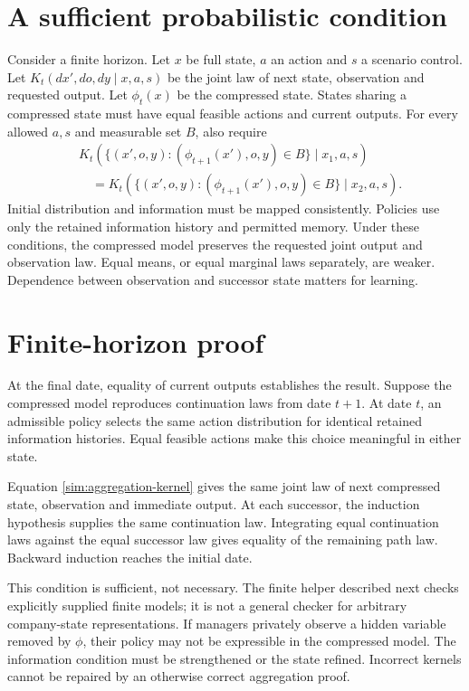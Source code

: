 \section{A sufficient probabilistic condition}
Consider a finite horizon. Let $x$ be full state, $a$ an action and $s$ a scenario control. Let $K_t(dx',do,dy\mid x,a,s)$ be the joint law of next state, observation and requested output. Let $\phi_t(x)$ be the compressed state. States sharing a compressed state must have equal feasible actions and current outputs. For every allowed $a,s$ and measurable set $B$, also require
\begin{align}
 &K_t(\{(x',o,y):(\phi_{t+1}(x'),o,y)\in B\}\mid x_1,a,s)\nonumber\\
 &\quad=K_t(\{(x',o,y):(\phi_{t+1}(x'),o,y)\in B\}\mid x_2,a,s).
 \label{sim:aggregation-kernel}
\end{align}
Initial distribution and information must be mapped consistently. Policies use only the retained information history and permitted memory. Under these conditions, the compressed model preserves the requested joint output and observation law. Equal means, or equal marginal laws separately, are weaker. Dependence between observation and successor state matters for learning.

\section{Finite-horizon proof}
At the final date, equality of current outputs establishes the result. Suppose the compressed model reproduces continuation laws from date $t+1$. At date $t$, an admissible policy selects the same action distribution for identical retained information histories. Equal feasible actions make this choice meaningful in either state.

Equation \eqref{sim:aggregation-kernel} gives the same joint law of next compressed state, observation and immediate output. At each successor, the induction hypothesis supplies the same continuation law. Integrating equal continuation laws against the equal successor law gives equality of the remaining path law. Backward induction reaches the initial date.

This condition is sufficient, not necessary. The finite helper described next checks explicitly supplied finite models; it is not a general checker for arbitrary company-state representations. If managers privately observe a hidden variable removed by $\phi$, their policy may not be expressible in the compressed model. The information condition must be strengthened or the state refined. Incorrect kernels cannot be repaired by an otherwise correct aggregation proof.


